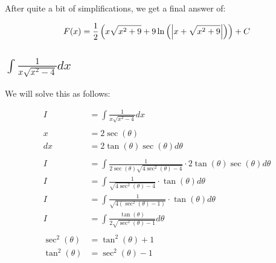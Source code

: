 \documentclass[12pt]{article}
\begin{document}
After quite a bit of simplifications, we get a final answer of:

$$
    F(x) = \frac{1}{2}\left(x\sqrt{x^2+9} + 9\ln\left(\left|x+\sqrt{x^2+9}\right|\right)\right) + C \\
$$

\subsection{$\int \frac{1}{x\sqrt{x^2 - 4}} dx$}

We will solve this as follows:


\begin{align}
    I              & = \int \frac{1}{x\sqrt{x^2 - 4}} dx                                                              \\
    \nonumber                                                                                                         \\
    x              & = 2\sec(\theta)                                                                                  \\
    dx             & = 2\tan(\theta)\sec(\theta) d\theta                                                              \\
    \nonumber                                                                                                         \\
    I              & = \int \frac{1}{2\sec(\theta)\sqrt{4\sec^2(\theta) - 4}} \cdot 2\tan(\theta)\sec(\theta) d\theta \\
    I              & = \int \frac{1}{\sqrt{4\sec^2(\theta) - 4}} \cdot \tan(\theta) d\theta                           \\
    I              & = \int \frac{1}{\sqrt{4(\sec^2(\theta) - 1)}} \cdot \tan(\theta) d\theta                         \\
    I              & = \int \frac{\tan(\theta)}{2\sqrt{\sec^2(\theta) - 1}} d\theta                                   \\
    \nonumber                                                                                                         \\
    \sec^2(\theta) & = \tan^2(\theta) + 1                                                                             \\
    \tan^2(\theta) & = \sec^2(\theta) - 1                                                                             \\

\end{align}
\end{document}
